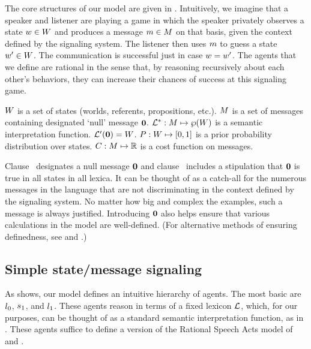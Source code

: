 \documentclass[12pt,twoside]{article}
\renewcommand{\_}{\textbf{\textunderscore\hspace{-4pt}\textunderscore\hspace{-3pt}\textunderscore\hspace{-4pt}\textunderscore}\hspace{0.5pt}}			%
\begin{document}
The core structures of our model are given in .
Intuitively, we imagine that a speaker and listener are playing a game
in which the speaker privately observes a state $w \in W$
and produces a message $m \in M$ on that basis, given the
context defined by the signaling system. The listener then uses $m$
to guess a state $w' \in W$. The communication is
successful just in case $w = w'$. The agents that we define
are rational in the sense that, by reasoning recursively about each
other's behaviors, they can increase their chances of success at this
signaling game.
%
\begin{exe}
\ex\label{model}
  \begin{xlist}
  \ex\label{states}%
    $W$ is a set of states (worlds, referents, propositions, etc.).
  \ex\label{messages}%
    $M$ is a set of messages containing designated `null' message $\mathbf{0}$.
  \ex\label{lex}%
    $\mathcal{L}^{\ast}: M \mapsto \wp(W)$ is a semantic interpretation function. 
    $\mathcal{L}'(\mathbf{0}) = W$.
  \ex\label{prior}%
    $P : W \mapsto [0,1]$ is a prior probability
    distribution over states.    
  \ex\label{costs}%
    $C : M \mapsto \mathbb{R}$ is a cost function on messages.
  \end{xlist}
\end{exe}

Clause~ designates a null message $\mathbf{0}$
and clause~ includes a stipulation that $\mathbf{0}$
is true in all states in all lexica. It can be thought of as a
catch-all for the numerous messages in the language that are not
discriminating in the context defined by the signaling system.  No
matter how big and complex the examples, such a message is always
justified. Introducing $\mathbf{0}$ also helps ensure that various
calculations in the model are well-defined. (For alternative methods
of ensuring definedness, see \citealt{Jaeger:2011} and
\citealt{bergen-levy-goodman:2014}.)


\subsection{Simple state/message signaling}\label{sec:rsa}

As  shows, our model defines an intuitive hierarchy
of agents. The most basic are $l_{0}$, $s_{1}$, and
$l_{1}$. These agents reason in terms of a fixed lexicon
$\mathcal{L}$, which, for our purposes, can be thought of as a standard
semantic interpretation function, as in . These
agents suffice to define a version of the Rational Speech Acts model
of \citet{Frank:Goodman:2012} and \citet{Goodman:Stuhlmuller:2013}.
\end{document}
